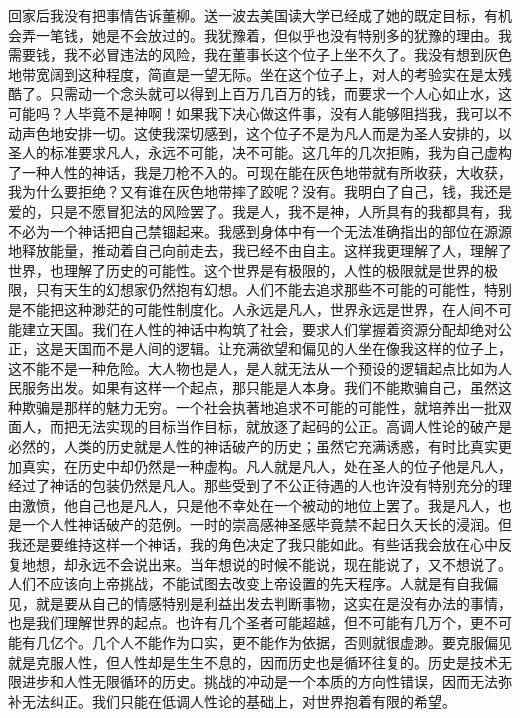 \documentclass[12pt,oneside]{book}
\begin{document}
回家后我没有把事情告诉董柳。送一波去美国读大学已经成了她的既定目标，有机会弄一笔钱，她是不会放过的。我犹豫着，但似乎也没有特别多的犹豫的理由。我需要钱，我不必冒违法的风险，我在董事长这个位子上坐不久了。我没有想到灰色地带宽阔到这种程度，简直是一望无际。坐在这个位子上，对人的考验实在是太残酷了。只需动一个念头就可以得到上百万几百万的钱，而要求一个人心如止水，这可能吗？人毕竟不是神啊！如果我下决心做这件事，没有人能够阻挡我，我可以不动声色地安排一切。这使我深切感到，这个位子不是为凡人而是为圣人安排的，以圣人的标准要求凡人，永远不可能，决不可能。这几年的几次拒贿，我为自己虚构了一种人性的神话，我是刀枪不入的。可现在能在灰色地带就有所收获，大收获，我为什么要拒绝？又有谁在灰色地带摔了跤呢？没有。我明白了自己，钱，我还是爱的，只是不愿冒犯法的风险罢了。我是人，我不是神，人所具有的我都具有，我不必为一个神话把自己禁锢起来。我感到身体中有一个无法准确指出的部位在源源地释放能量，推动着自己向前走去，我已经不由自主。这样我更理解了人，理解了世界，也理解了历史的可能性。这个世界是有极限的，人性的极限就是世界的极限，只有天生的幻想家仍然抱有幻想。人们不能去追求那些不可能的可能性，特别是不能把这种渺茫的可能性制度化。人永远是凡人，世界永远是世界，在人间不可能建立天国。我们在人性的神话中构筑了社会，要求人们掌握着资源分配却绝对公正，这是天国而不是人间的逻辑。让充满欲望和偏见的人坐在像我这样的位子上，这不能不是一种危险。大人物也是人，是人就无法从一个预设的逻辑起点比如为人民服务出发。如果有这样一个起点，那只能是人本身。我们不能欺骗自己，虽然这种欺骗是那样的魅力无穷。一个社会执著地追求不可能的可能性，就培养出一批双面人，而把无法实现的目标当作目标，就放逐了起码的公正。高调人性论的破产是必然的，人类的历史就是人性的神话破产的历史；虽然它充满诱惑，有时比真实更加真实，在历史中却仍然是一种虚构。凡人就是凡人，处在圣人的位子他是凡人，经过了神话的包装仍然是凡人。那些受到了不公正待遇的人也许没有特别充分的理由激愤，他自己也是凡人，只是他不幸处在一个被动的地位上罢了。我是凡人，也是一个人性神话破产的范例。一时的崇高感神圣感毕竟禁不起日久天长的浸润。但我还是要维持这样一个神话，我的角色决定了我只能如此。有些话我会放在心中反复地想，却永远不会说出来。当年想说的时候不能说，现在能说了，又不想说了。人们不应该向上帝挑战，不能试图去改变上帝设置的先天程序。人就是有自我偏见，就是要从自己的情感特别是利益出发去判断事物，这实在是没有办法的事情，也是我们理解世界的起点。也许有几个圣者可能超越，但不可能有几万个，更不可能有几亿个。几个人不能作为口实，更不能作为依据，否则就很虚渺。要克服偏见就是克服人性，但人性却是生生不息的，因而历史也是循环往复的。历史是技术无限进步和人性无限循环的历史。挑战的冲动是一个本质的方向性错误，因而无法弥补无法纠正。我们只能在低调人性论的基础上，对世界抱着有限的希望。
\end{document}
